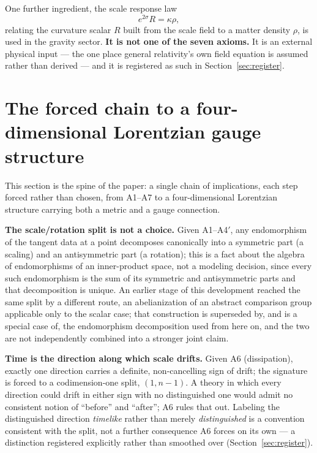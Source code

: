 \documentclass[aps,prd,twocolumn,superscriptaddress,nofootinbib]{revtex4-2}
\begin{document}
One further ingredient, the scale response law
\begin{equation}
e^{2\sigma}R = \kappa \rho, \tag{A6$'$}
\end{equation}
relating the curvature scalar $R$ built from the scale field to a matter
density $\rho$, is used in the gravity sector. \textbf{It is not one of
the seven axioms.} It is an external physical input — the one place
general relativity's own field equation is assumed rather than derived —
and it is registered as such in Section~\ref{sec:register}.

\section{The forced chain to a four-dimensional Lorentzian gauge structure}\label{sec:chain}

This section is the spine of the paper: a single chain of implications,
each step forced rather than chosen, from A1–A7 to a four-dimensional
Lorentzian structure carrying both a metric and a gauge connection.

\textbf{The scale/rotation split is not a choice.} Given A1–A4$'$, any
endomorphism of the tangent data at a point decomposes canonically into a
symmetric part (a scaling) and an antisymmetric part (a rotation); this
is a fact about the algebra of endomorphisms of an inner-product space,
not a modeling decision, since every such endomorphism is the sum of its
symmetric and antisymmetric parts and that decomposition is unique. An
earlier stage of this development reached the same split by a different
route, an abelianization of an abstract comparison group applicable only
to the scalar case; that construction is superseded by, and is a special
case of, the endomorphism decomposition used from here on, and the two
are not independently combined into a stronger joint claim.

\textbf{Time is the direction along which scale drifts.} Given A6
(dissipation), exactly one direction carries a definite, non-cancelling
sign of drift; the signature is forced to a codimension-one split,
$(1,n-1)$. A theory in which every direction could drift in either sign
with no distinguished one would admit no consistent notion of ``before''
and ``after''; A6 rules that out. Labeling the distinguished direction
\emph{timelike} rather than merely \emph{distinguished} is a convention
consistent with the split, not a further consequence A6 forces on its
own — a distinction registered explicitly rather than smoothed over
(Section~\ref{sec:register}).
\end{document}
